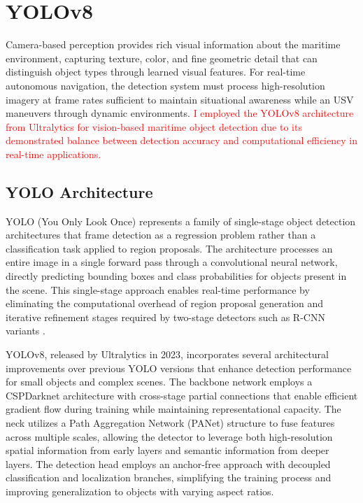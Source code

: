 
\section{YOLOv8} \label{yolo}

Camera-based perception provides rich visual information about the maritime environment, capturing texture, color, and fine geometric detail that can distinguish object types through learned visual features.
For real-time autonomous navigation, the detection system must process high-resolution imagery at frame rates sufficient to maintain situational awareness while an \ac{USV} maneuvers through dynamic environments.
\textcolor{red}{I employed the YOLOv8 architecture from Ultralytics for vision-based maritime object detection due to its demonstrated balance between detection accuracy and computational efficiency in real-time applications.}

\subsection{YOLO Architecture } \label{sec:yolo_architecture}

YOLO (You Only Look Once) represents a family of single-stage object detection architectures that frame detection as a regression problem rather than a classification task applied to region proposals.
The architecture processes an entire image in a single forward pass through a convolutional neural network, directly predicting bounding boxes and class probabilities for objects present in the scene.
This single-stage approach enables real-time performance by eliminating the computational overhead of region proposal generation and iterative refinement stages required by two-stage detectors such as R-CNN variants \cite{ultralytics}.

YOLOv8, released by Ultralytics in 2023, incorporates several architectural improvements over previous YOLO versions that enhance detection performance for small objects and complex scenes.
The backbone network employs a CSPDarknet architecture with cross-stage partial connections that enable efficient gradient flow during training while maintaining representational capacity.
The neck utilizes a Path Aggregation Network (PANet) structure to fuse features across multiple scales, allowing the detector to leverage both high-resolution spatial information from early layers and semantic information from deeper layers.
The detection head employs an anchor-free approach with decoupled classification and localization branches, simplifying the training process and improving generalization to objects with varying aspect ratios.

